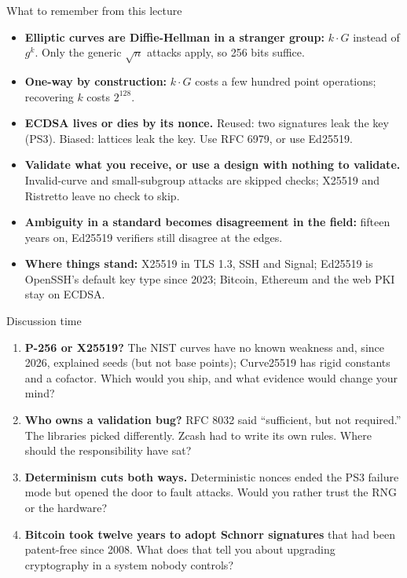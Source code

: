 \ifdefined\PRESENTATION\else\PassOptionsToClass{handout}{beamer}\fi\documentclass[aspectratio=169, lualatex]{beamer}
\begin{document}
\begin{frame}{What to remember from this lecture}
	\begin{itemize}
		\item \textbf{Elliptic curves are Diffie-Hellman in a stranger group:} $k \cdot G$ instead of $g^k$. Only the generic $\sqrt{n}$ attacks apply, so 256 bits suffice.
		\item \textbf{One-way by construction:} $k \cdot G$ costs a few hundred point operations; recovering $k$ costs $2^{128}$.
		\item \textbf{ECDSA lives or dies by its nonce.} Reused: two signatures leak the key (PS3). Biased: lattices leak the key. Use RFC 6979, or use Ed25519.
		\item \textbf{Validate what you receive, or use a design with nothing to validate.} Invalid-curve and small-subgroup attacks are skipped checks; X25519 and Ristretto leave no check to skip.
		\item \textbf{Ambiguity in a standard becomes disagreement in the field:} fifteen years on, Ed25519 verifiers still disagree at the edges.
		\item \textbf{Where things stand:} X25519 in TLS 1.3, SSH and Signal; Ed25519 is OpenSSH's default key type since 2023; Bitcoin, Ethereum and the web PKI stay on ECDSA.
	\end{itemize}
\end{frame}

\begin{frame}{Discussion time}
	\begin{enumerate}
		\item \textbf{P-256 or X25519?} The NIST curves have no known weakness and, since 2026, explained seeds (but not base points); Curve25519 has rigid constants and a cofactor. Which would you ship, and what evidence would change your mind?
		\item \textbf{Who owns a validation bug?} RFC 8032 said ``sufficient, but not required.'' The libraries picked differently. Zcash had to write its own rules. Where should the responsibility have sat?
		\item \textbf{Determinism cuts both ways.} Deterministic nonces ended the PS3 failure mode but opened the door to fault attacks. Would you rather trust the RNG or the hardware?
		\item \textbf{Bitcoin took twelve years to adopt Schnorr signatures} that had been patent-free since 2008. What does that tell you about upgrading cryptography in a system nobody controls?
	\end{enumerate}
\end{frame}

\begin{frame}[plain]
	\titlepage
\end{frame}
\end{document}
